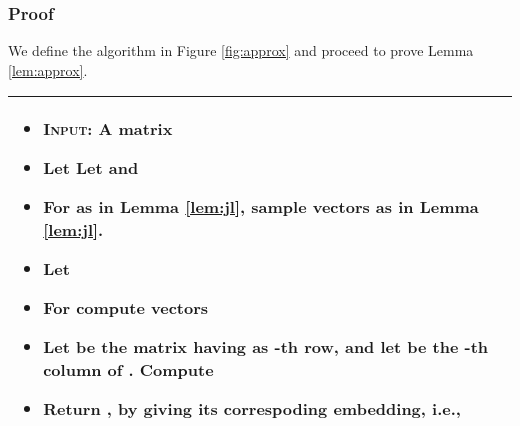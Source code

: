 \documentclass[twoside,leqno,twocolumn]{article}
\numberwithin{equation}{section}
\begin{document}
\subsubsection{Proof}

We define the  algorithm in Figure \ref{fig:approx} and proceed to prove Lemma \ref{lem:approx}.
\begin{figure*}[h]
  \begin{tabularx}{\textwidth}{|X|}
    \hline
  \begin{itemize}
\item {\bf \textsc{Input:}} A matrix 
\item Let  Let  and 
\item For  as in Lemma \ref{lem:jl}, sample  vectors  as in Lemma \ref{lem:jl}.
\item Let 
\item For  compute vectors 

 \item Let  be the matrix having  as -th row,  and let  be the -th column of . Compute 
\item  Return , by giving its correspoding embedding, i.e.,  

  
  \end{itemize}\\
   \hline
    \end{tabularx}

  \caption{The  algorithm}
  \label{fig:approx}
\end{figure*}
\end{document}
